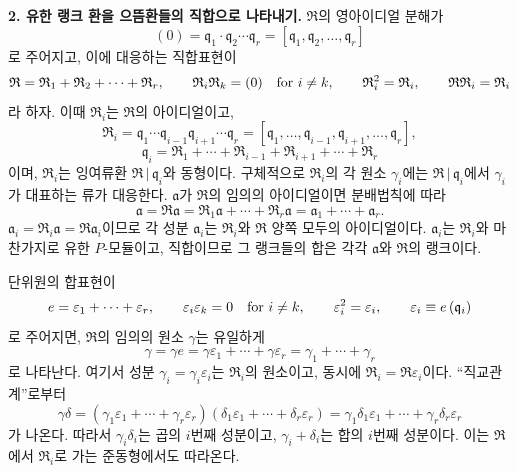 \textbf{2. 유한 랭크 환을 으뜸환들의 직합으로 나타내기.} \(\mathfrak R\)의 영아이디얼 분해가
\[
   (0)=\mathfrak q_1\cdot\mathfrak q_2\cdots\mathfrak q_r
      =[\mathfrak q_1,\mathfrak q_2,\ldots,\mathfrak q_r]
\]
로 주어지고, 이에 대응하는 직합표현이
\[
   \mathfrak R=\mathfrak R_1+\mathfrak R_2+\cdots+\mathfrak R_r,
   \qquad
   \mathfrak R_i\mathfrak R_k=(0)\quad\hbox{for } i\ne k,
   \qquad
   \mathfrak R_i^2=\mathfrak R_i,
   \qquad
   \mathfrak R\mathfrak R_i=\mathfrak R_i
\]
라 하자. 이때 \(\mathfrak R_i\)는 \(\mathfrak R\)의 아이디얼이고,
\[
   \mathfrak R_i
   =\mathfrak q_1\cdots\mathfrak q_{i-1}\mathfrak q_{i+1}\cdots\mathfrak q_r
   =[\mathfrak q_1,\ldots,\mathfrak q_{i-1},\mathfrak q_{i+1},\ldots,\mathfrak q_r],
\]
\[
   \mathfrak q_i=\mathfrak R_1+\cdots+\mathfrak R_{i-1}+\mathfrak R_{i+1}+\cdots+\mathfrak R_r
\]
이며, \(\mathfrak R_i\)는 잉여류환 \(\mathfrak R\,|\,\mathfrak q_i\)와 동형이다. 구체적으로 \(\mathfrak R_i\)의 각 원소 \(\gamma_i\)에는 \(\mathfrak R\,|\,\mathfrak q_i\)에서 \(\gamma_i\)가 대표하는 류가 대응한다. \(\mathfrak a\)가 \(\mathfrak R\)의 임의의 아이디얼이면 분배법칙에 따라
\[
   \mathfrak a=\mathfrak R\mathfrak a
   =\mathfrak R_1\mathfrak a+\cdots+\mathfrak R_r\mathfrak a
   =\mathfrak a_1+\cdots+\mathfrak a_r.
\]
\(\mathfrak a_i=\mathfrak R_i\mathfrak a=\mathfrak R\mathfrak a_i\)이므로 각 성분 \(\mathfrak a_i\)는 \(\mathfrak R_i\)와 \(\mathfrak R\) 양쪽 모두의 아이디얼이다. \(\mathfrak a_i\)는 \(\mathfrak R_i\)와 마찬가지로 유한 \(P\)-모듈이고, 직합이므로 그 랭크들의 합은 각각 \(\mathfrak a\)와 \(\mathfrak R\)의 랭크이다.

단위원의 합표현이
\[
   e=\varepsilon_1+\cdots+\varepsilon_r,
   \qquad
   \varepsilon_i\varepsilon_k=0\quad\hbox{for } i\ne k,
   \qquad
   \varepsilon_i^2=\varepsilon_i,
   \qquad
   \varepsilon_i\equiv e\,(\mathfrak q_i)
\]
로 주어지면, \(\mathfrak R\)의 임의의 원소 \(\gamma\)는 유일하게
\[
   \gamma=\gamma e=\gamma\varepsilon_1+\cdots+\gamma\varepsilon_r
      =\gamma_1+\cdots+\gamma_r
\]
로 나타난다. 여기서 성분 \(\gamma_i=\gamma_i\varepsilon_i\)는 \(\mathfrak R_i\)의 원소이고, 동시에 \(\mathfrak R_i=\mathfrak R\varepsilon_i\)이다. “직교관계”로부터
\[
   \gamma\delta=(\gamma_1\varepsilon_1+\cdots+\gamma_r\varepsilon_r)
      (\delta_1\varepsilon_1+\cdots+\delta_r\varepsilon_r)
   =\gamma_1\delta_1\varepsilon_1+\cdots+\gamma_r\delta_r\varepsilon_r
\]
가 나온다. 따라서 \(\gamma_i\delta_i\)는 곱의 \(i\)번째 성분이고, \(\gamma_i+\delta_i\)는 합의 \(i\)번째 성분이다. 이는 \(\mathfrak R\)에서 \(\mathfrak R_i\)로 가는 준동형에서도 따라온다.

